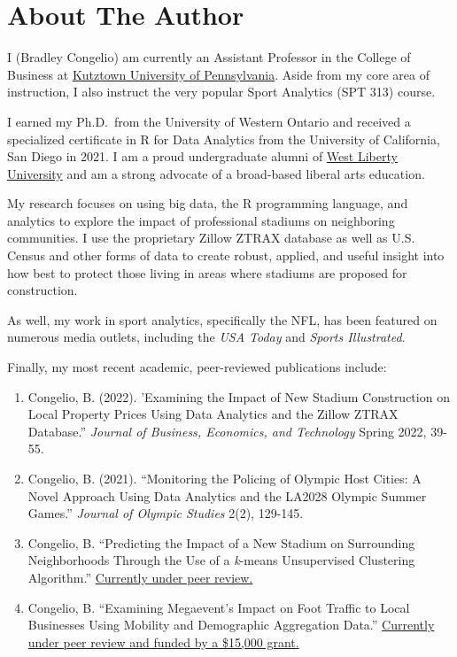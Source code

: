 \documentclass[
  letterpaper,
]{krantz}
\begin{document}
\hypertarget{about-the-author}{%
\section*{About The Author}\label{about-the-author}}


I (Bradley Congelio) am currently an Assistant Professor in the College
of Business at \href{https://www.kutztown.edu/}{Kutztown University of
Pennsylvania}. Aside from my core area of instruction, I also instruct
the very popular Sport Analytics (SPT 313) course.

I earned my Ph.D.~from the University of Western Ontario and received a
specialized certificate in R for Data Analytics from the University of
California, San Diego in 2021. I am a proud undergraduate alumni of
\href{https://westliberty.edu/}{West Liberty University} and am a strong
advocate of a broad-based liberal arts education.

My research focuses on using big data, the R programming language, and
analytics to explore the impact of professional stadiums on neighboring
communities. I use the proprietary Zillow ZTRAX database as well as U.S.
Census and other forms of data to create robust, applied, and useful
insight into how best to protect those living in areas where stadiums
are proposed for construction.

As well, my work in sport analytics, specifically the NFL, has been
featured on numerous media outlets, including the \emph{USA Today} and
\emph{Sports Illustrated}.

Finally, my most recent academic, peer-reviewed publications include:

\begin{enumerate}
\def\labelenumi{\arabic{enumi}.}
\item
  Congelio, B. (2022). 'Examining the Impact of New Stadium Construction
  on Local Property Prices Using Data Analytics and the Zillow ZTRAX
  Database.'' \emph{Journal of Business, Economics, and Technology}
  Spring 2022, 39-55.
\item
  Congelio, B. (2021). ``Monitoring the Policing of Olympic Host Cities:
  A Novel Approach Using Data Analytics and the LA2028 Olympic Summer
  Games.'' \emph{Journal of Olympic Studies} 2(2), 129-145.
\item
  Congelio, B. ``Predicting the Impact of a New Stadium on Surrounding
  Neighborhoods Through the Use of a \emph{k}-means Unsupervised
  Clustering Algorithm.'' \ul{Currently under peer review.}
\item
  Congelio, B. ``Examining Megaevent's Impact on Foot Traffic to Local
  Businesses Using Mobility and Demographic Aggregation Data.''
  \ul{Currently under peer review and funded by a \$15,000 grant.}
\end{enumerate}
\end{document}
